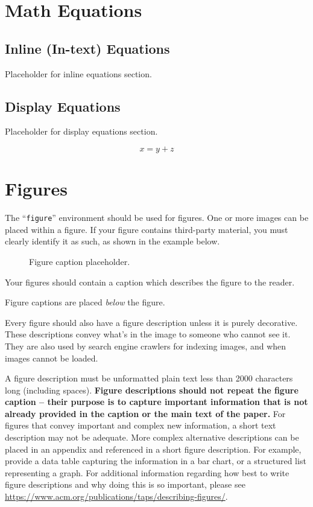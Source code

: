 \section{Math Equations}

\subsection{Inline (In-text) Equations}

Placeholder for inline equations section.

\subsection{Display Equations}

Placeholder for display equations section.

\begin{equation}
  x = y + z
\end{equation}

\section{Figures}

The ``\verb|figure|'' environment should be used for figures. One or
more images can be placed within a figure. If your figure contains
third-party material, you must clearly identify it as such, as shown
in the example below.

\begin{figure}
  \centering
  \caption{Figure caption placeholder.}
\end{figure}

Your figures should contain a caption which describes the figure to
the reader.

Figure captions are placed {\itshape below} the figure.

Every figure should also have a figure description unless it is purely
decorative. These descriptions convey what's in the image to someone
who cannot see it. They are also used by search engine crawlers for
indexing images, and when images cannot be loaded.

A figure description must be unformatted plain text less than 2000
characters long (including spaces).  {\bfseries Figure descriptions
    should not repeat the figure caption – their purpose is to capture
    important information that is not already provided in the caption or
    the main text of the paper.} For figures that convey important and
complex new information, a short text description may not be
adequate. More complex alternative descriptions can be placed in an
appendix and referenced in a short figure description. For example,
provide a data table capturing the information in a bar chart, or a
structured list representing a graph.  For additional information
regarding how best to write figure descriptions and why doing this is
so important, please see
\url{https://www.acm.org/publications/taps/describing-figures/}.

